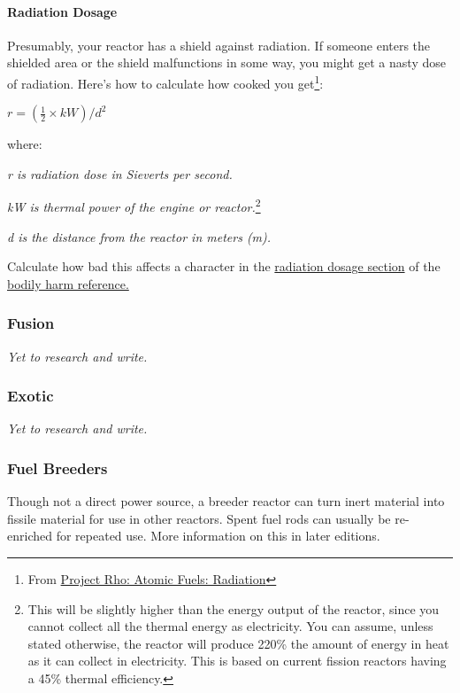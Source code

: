 \paragraph{Radiation Dosage}Presumably, your reactor has a shield against radiation. If someone enters the shielded area or the shield malfunctions in some way, you might get a nasty dose of radiation. Here's how to calculate how cooked you get\footnote{From \href{http://www.projectrho.com/public_html/rocket/atomicfuel.php}{Project Rho: Atomic Fuels: Radiation}}:

$r = (\frac{1}{2} \times kW) / d^{2}$

\par
where:
\par
\textit{r is radiation dose in Sieverts per second.}
\par
\textit{kW is thermal power of the engine or reactor.}\footnote{This will be slightly higher than the energy output of the reactor, since you cannot collect all the thermal energy as electricity. You can assume, unless stated otherwise, the reactor will produce 220\% the amount of energy in heat as it can collect in electricity. This is based on current fission reactors having a 45\% thermal efficiency.}
\par
\textit{d is the distance from the reactor in meters (m).}

\par
Calculate how bad this affects a character in the \hyperlink{harm_radiation}{radiation dosage section} of the \hyperlink{harm}{bodily harm reference.}

\subsubsection{Fusion}

\textit{Yet to research and write.}

\subsubsection{Exotic}

\textit{Yet to research and write.}

\subsubsection{Fuel Breeders}

Though not a direct power source, a breeder reactor can turn inert material into fissile material for use in other reactors. Spent fuel rods can usually be re-enriched for repeated use. More information on this in later editions.

